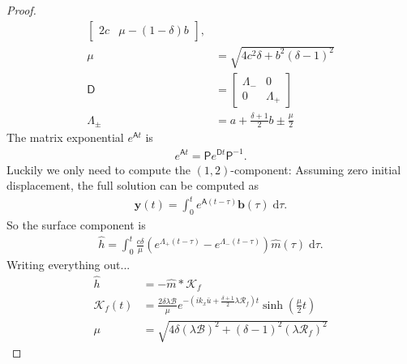 \documentclass[paper=a4, fontsize=11pt]{article}
\begin{document}
\begin{proof}
\begin{align}
\begin{bmatrix}
2c &  \mu-(1-\delta)b
\end{bmatrix},\\
\mu &= \sqrt{4c^2 \delta + b^2(\delta-1)^2}\\
\mathsf{D} &= \begin{bmatrix}
\Lambda_-  & 0 \\
0 & \Lambda_+
\end{bmatrix} \\
\Lambda_\pm &= a+\frac{\delta+1}{2}b \pm \frac{\mu}{2}
\end{align}
The matrix exponential $e^{\mathsf{A}t}$ is
\begin{align}
e^{\mathsf{A}t} = \mathsf{P}e^{\mathsf{D}t}\mathsf{P}^{-1}.
\end{align}
Luckily we only need to compute the $(1,2)$-component:
Assuming zero initial displacement, the full solution can be computed as
\begin{align}
\pmb{y}(t) = \int_0^t e^{\mathsf{A}(t-\tau)} \pmb{b}(\tau)\;\mathrm{d}\tau. \label{ysol}
\end{align}
So the surface component is
\begin{align}
\hat{h}=\int_0^t \frac{c\delta}{\mu}(e^{\Lambda_+ (t-\tau)}-e^{\Lambda_-(t-\tau)})\hat{m}(\tau)\;\mathrm{d}\tau.
\end{align}
Writing everything out...
\begin{align}
\hat{h} &= -\hat{m} * \mathcal{K}_f \\
\mathcal{K}_f(t)  &= \frac{2\delta\lambda\mathcal{B}}{\mu} e^{-\left(ik_x\bar{u}+\frac{\delta+1}{2}\lambda\mathcal{R}_f\right)t}\sinh\left({\frac{\mu}{2}t}\right)   \\
\mu &= \sqrt{4\delta(\lambda\mathcal{B})^2 + (\delta-1)^2(\lambda\mathcal{R}_f)^2 }
\end{align}
\end{proof}


%
\end{document}
